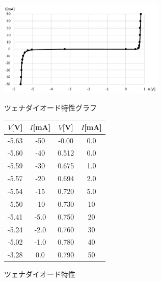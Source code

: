 \documentclass[uplatex,dvipdfmx,a4paper,js=standard, titlepage]{bxjsarticle}
\begin{document}
            \begin{figure}[ht]
                \begin{minipage}{0.5\hsize}
                    \begin{center}
                        \includegraphics[width=8cm]{graphs/zener_graph.pdf}
                        \caption{ツェナダイオード特性グラフ}
                        \label{fig:zener_graph}
                    \end{center}
                \end{minipage}
                \def\@captype{table}
                \begin{minipage}{0.5\hsize}
                    \begin{center}
                        \caption{ツェナダイオード特性}
                        \label{tab:zener_table}
                        \begin{tabular}{c|c||c|c}
                            $V$[V] & $I$[mA] & $V$[V] & $I$[mA] \\ \hline \hline
                            -5.63 & -50 & -0.00 & 0.0 \\
                            -5.60 & -40 & 0.512 & 0.0 \\
                            -5.59 & -30 & 0.675 & 1.0 \\
                            -5.57 & -20 & 0.694 & 2.0 \\
                            -5.54 & -15 & 0.720 & 5.0 \\
                            -5.50 & -10 & 0.730 & 10 \\
                            -5.41 & -5.0 & 0.750 & 20 \\
                            -5.24 & -2.0 & 0.760 & 30 \\
                            -5.02 & -1.0 & 0.780 & 40 \\
                            -3.28 & 0.0 & 0.790 & 50 \\
                        \end{tabular}
                    \end{center}
                \end{minipage}
            \end{figure}
\end{document}
